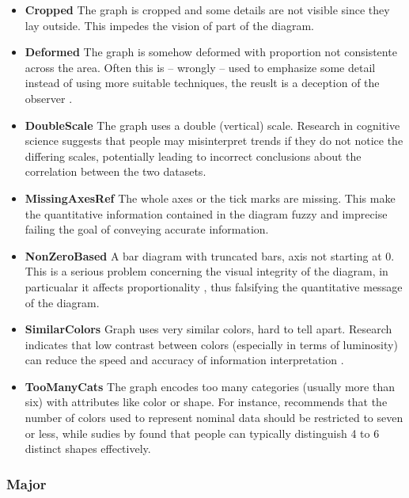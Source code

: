\documentclass[
  10pt,
  conference,
]{IEEEtran}%
\begin{document}
\begin{itemize}
\item
  \textbf{Cropped} The graph is cropped and some details are not visible
  since they lay outside. This impedes the vision of part of the
  diagram.
\item
  \textbf{Deformed} The graph is somehow deformed with proportion not
  consistente across the area. Often this is -- wrongly -- used to
  emphasize some detail instead of using more suitable techniques, the
  reuslt is a deception of the observer
  .
\item
  \textbf{DoubleScale} The graph uses a double (vertical) scale.
  Research in cognitive science  suggests
  that people may misinterpret trends if they do not notice the
  differing scales, potentially leading to incorrect conclusions about
  the correlation between the two datasets.
\item
  \textbf{MissingAxesRef} The whole axes or the tick marks are missing.
  This make the quantitative information contained in the diagram fuzzy
  and imprecise failing the goal of conveying accurate information.
\item
  \textbf{NonZeroBased} A bar diagram with truncated bars, axis not
  starting at 0. This is a serious problem concerning the visual
  integrity of the diagram, in particualar it affects proportionality
  , thus falsifying the quantitative
  message of the diagram.
\item
  \textbf{SimilarColors} Graph uses very similar colors, hard to tell
  apart. Research indicates that low contrast between colors (especially
  in terms of luminosity) can reduce the speed and accuracy of
  information interpretation .
\item
  \textbf{TooManyCats} The graph encodes too many categories (usually
  more than six) with attributes like color or shape. For instance,
   recommends that the number of
  colors used to represent nominal data should be restricted to seven or
  less, while sudies by  found that
  people can typically distinguish 4 to 6 distinct shapes effectively.
\end{itemize}

\subsubsection{Major}\label{major}
\end{document}
